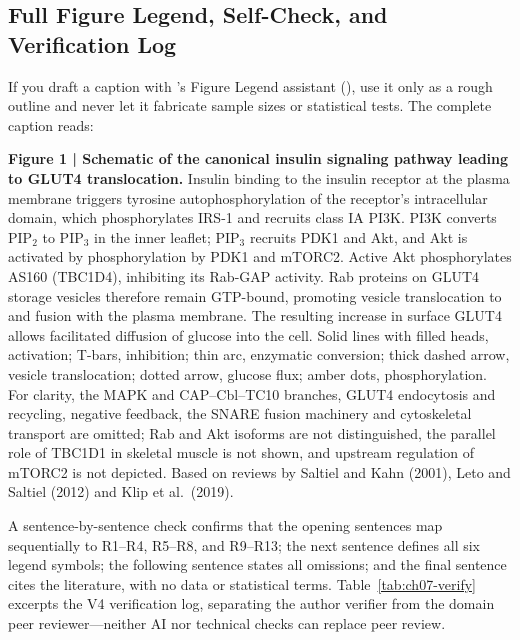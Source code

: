 \subsection{Full Figure Legend, Self-Check, and Verification Log}

If you draft a caption with \scidraw{}'s Figure Legend assistant (), use it only as a rough outline and never let it fabricate sample sizes or statistical tests. The complete caption reads:

\begin{BookNote}
\textbf{Figure 1 | Schematic of the canonical insulin signaling pathway leading to GLUT4 translocation.} Insulin binding to the insulin receptor at the plasma membrane triggers tyrosine autophosphorylation of the receptor's intracellular domain, which phosphorylates IRS-1 and recruits class IA PI3K. PI3K converts $\text{PIP}_2$ to $\text{PIP}_3$ in the inner leaflet; $\text{PIP}_3$ recruits PDK1 and Akt, and Akt is activated by phosphorylation by PDK1 and mTORC2. Active Akt phosphorylates AS160 (TBC1D4), inhibiting its Rab-GAP activity. Rab proteins on GLUT4 storage vesicles therefore remain GTP-bound, promoting vesicle translocation to and fusion with the plasma membrane. The resulting increase in surface GLUT4 allows facilitated diffusion of glucose into the cell. Solid lines with filled heads, activation; T-bars, inhibition; thin arc, enzymatic conversion; thick dashed arrow, vesicle translocation; dotted arrow, glucose flux; amber dots, phosphorylation. For clarity, the MAPK and CAP--Cbl--TC10 branches, GLUT4 endocytosis and recycling, negative feedback, the SNARE fusion machinery and cytoskeletal transport are omitted; Rab and Akt isoforms are not distinguished, the parallel role of TBC1D1 in skeletal muscle is not shown, and upstream regulation of mTORC2 is not depicted. Based on reviews by Saltiel and Kahn (2001), Leto and Saltiel (2012) and Klip et al.\ (2019).
\end{BookNote}

A sentence-by-sentence check confirms that the opening sentences map sequentially to R1--R4, R5--R8, and R9--R13; the next sentence defines all six legend symbols; the following sentence states all omissions; and the final sentence cites the literature, with no data or statistical terms. Table~\ref{tab:ch07-verify} excerpts the V4 verification log, separating the author verifier from the domain peer reviewer---neither AI nor technical checks can replace peer review.

